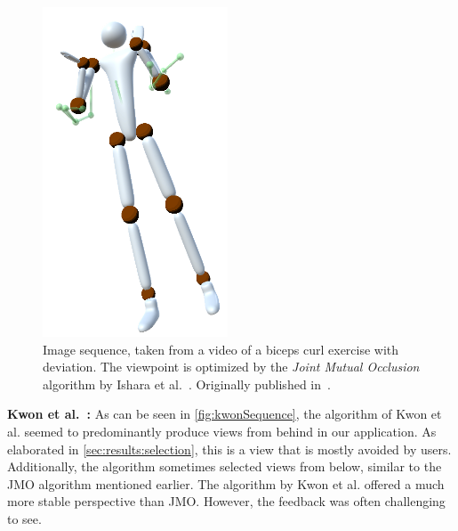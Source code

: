 \begin{figure}[h]
	\includegraphics[width=0.12\linewidth]{pictures/jmoSequence8.png}\hfill
	\caption{Image sequence, taken from a video of a biceps curl exercise with deviation. The viewpoint is optimized by the \emph{Joint Mutual Occlusion} algorithm by Ishara et al.~\cite{ishara2015mra}. Originally published in~\cite{diller2024automatic}.}
	\label{fig:jmoSequence}
\end{figure}

\textbf{Kwon et al.~\cite{kwon2020ocp}:} 
As can be seen in \autoref{fig:kwonSequence}, the algorithm of Kwon et al. seemed to predominantly produce views from behind in our application. As elaborated in \autoref{sec:results:selection}, this is a view that is mostly avoided by users. Additionally, the algorithm sometimes selected views from below, similar to the JMO algorithm mentioned earlier. The algorithm by Kwon et al. offered a much more stable perspective than JMO. However, the feedback was often challenging to see.

